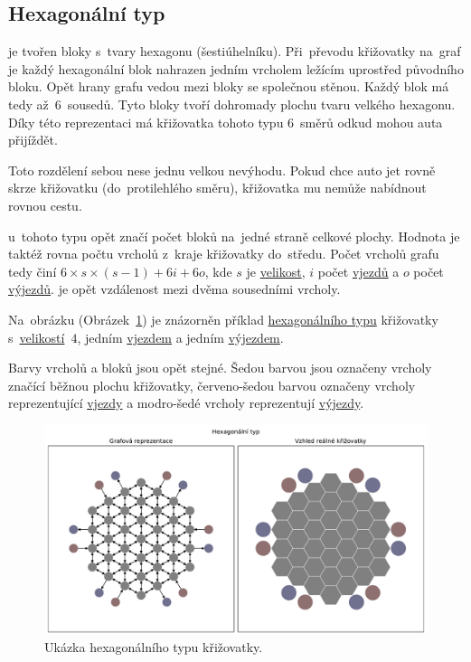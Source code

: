 \subsection{Hexagonální typ}\label{subsec:hexagonalni_typ}

 je tvořen bloky s~tvary hexagonu (šestiúhelníku).
Při~převodu křižovatky na~graf je každý hexagonální blok nahrazen jedním vrcholem ležícím uprostřed původního bloku.
Opět hrany grafu vedou mezi bloky se společnou stěnou.
Každý blok má tedy až~$6$~sousedů.
Tyto bloky tvoří dohromady plochu tvaru velkého hexagonu.
Díky této reprezentaci má křižovatka tohoto typu $6$~směrů odkud mohou auta přijíždět.

Toto rozdělení sebou nese jednu velkou nevýhodu.
Pokud chce auto jet rovně skrze křižovatku (do~protilehlého směru), křižovatka mu nemůže nabídnout rovnou cestu.

 u~tohoto typu opět značí počet bloků na~jedné straně celkové plochy.
Hodnota je taktéž rovna počtu vrcholů z~kraje křižovatky do~středu.
Počet vrcholů grafu tedy činí $6 \times s \times (s-1) + 6i + 6o$,
kde $s$ je \hyperref[par:velikost_krizovatky]{velikost},
$i$ počet \hyperref[par:vjezdy]{vjezdů} a $o$ počet \hyperref[par:vyjezdy]{výjezdů}.
 je opět vzdálenost mezi dvěma sousedními vrcholy.

Na~obrázku (Obrázek~\ref{fig:hexagonal_type_graph}) je znázorněn příklad
\hyperref[subsec:hexagonalni_typ]{hexagonálního typu} křižovatky s~\hyperref[par:velikost_krizovatky]{velikostí}~$4$,
jedním \hyperref[par:vjezdy]{vjezdem} a jedním \hyperref[par:vyjezdy]{výjezdem}.

Barvy vrcholů a bloků jsou opět stejné.
Šedou barvou jsou označeny vrcholy značící běžnou plochu křižovatky,
červeno-šedou barvou označeny vrcholy reprezentující \hyperref[par:vjezdy]{vjezdy} a
modro-šedé vrcholy reprezentují \hyperref[par:vyjezdy]{výjezdy}.

\begin{figure}[h]
	\centering
	\includegraphics[width=\textwidth]{../img/Hexagonal_grid}
	\caption{Ukázka hexagonálního typu křižovatky.}
	\label{fig:hexagonal_type_graph}
\end{figure}
